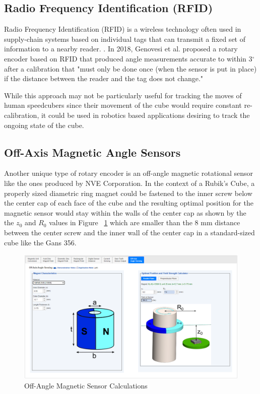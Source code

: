 \subsection{Radio Frequency Identification (RFID)}
\label{subsec:rfid}
Radio Frequency Identification (RFID) is a wireless technology often used in supply-chain systems \cite{rfid-rotary-encoder} based on individual tags that can transmit a fixed set of information to a nearby reader. \cite{fda-rfid}.
In 2018, Genovesi et al. proposed a rotary encoder based on RFID that produced angle measurements accurate to within 3$^\circ$ after a calibration that "must only be done once (when the sensor is put in place) if the distance between the reader and the tag does not change." \cite{rfid-rotary-encoder}

While this approach may not be particularly useful for tracking the moves of human speedcubers since their movement of the cube would require constant re-calibration, it could be used in robotics based applications desiring to track the ongoing state of the cube.

\subsection{Off-Axis Magnetic Angle Sensors}
\label{subsec:magnetic-angle-sensors}
Another unique type of rotary encoder is an off-angle magnetic rotational sensor like the ones produced by NVE Corporation. \cite{nve-mag-sensor} In the context of a Rubik's Cube, a properly sized diametric ring magnet could be fastened to the inner screw below the center cap of each face of the cube and the resulting optimal position for the magnetic sensor would stay within the walls of the center cap as shown by the the $z_0$ and $R_0$ values in Figure ~\ref{fig:nve-mag-calculations} which are smaller than the 8 mm distance between the center screw and the inner wall of the center cap in a standard-sized cube like the Gans 356.

\begin{figure}[h]
    \centering
    \caption[Off-Angle Magnetic Sensor Calculations]{Off-Angle Magnetic Sensor Calculations \cite{nve-mag-sensor-calculations}}
    \label{fig:nve-mag-calculations}
    \includegraphics[width=\linewidth]{Figures/3 State of the Art/nve-mag-calculations.png}
\end{figure}


